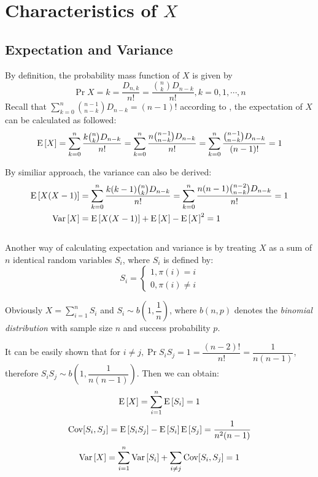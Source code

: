 
\section{Characteristics of $ X$}
\subsection{Expectation and Variance}
\label{f-random}
By definition, the probability mass function of $ X$ is given by
  \begin{equation}
  \Pr{X=k} = \dfrac{D_{n,k}}{n!}=\dfrac{{n\choose{k}}D_{n-k}}{n!}, k = 0,1,\cdots ,n
  \label{eqn:f-pr}
  \end{equation}
Recall that $ \sum_{k=0}^n{n-1 \choose{n-k}}D_{n-k}=(n-1)!$ according to ,
the expectation of $ X$ can be calculated as followed:
\begin{equation}
 \E{X} = \sum_{k=0}^n\dfrac{k{n\choose{k}}D_{n-k}}{n!} = \sum_{k=0}^n\dfrac{n{n-1\choose{n-k}}D_{n-k}}{n!} =
  \sum_{k=0}^n\dfrac{{n-1\choose{n-k}}D_{n-k}}{(n-1)!} = 1
  \label{eqn:exp1}
  \end{equation}

By similiar approach, the variance can also be derived:
\begin{align}
 \E{X(X-1)} &= \sum_{k=0}^n\dfrac{k(k-1){n\choose k}D_{n-k}}{n!}=\sum_{k=0}^n\dfrac{n(n-1){n-2 \choose{n-k}}D_{n-k}}{n!} = 1 \label{eqn:exp2} \\
 \Var{X} &= \E{X(X-1)} + \E{X}-\E{X}^2 = 1 \nonumber
\end{align}
\\

Another way of calculating expectation and variance is by treating $ X$ as a sum of $ n $ identical
random variables $ S_i$, where $ S_i$ is defined by:
\[ S_i = \begin{cases}1, \pi(i)=i\\0,\pi(i)\neq i\end{cases}\]

Obviously $ X = \sum_{i=1}^nS_i$ and $ S_i\sim b(1,\dfrac{1}{n})$, where $ b(n,p)$ denotes the
\emph{binomial distribution} with sample size $ n$ and success probability $ p$.

It can be easily shown that for $ i\neq j, \Pr{S_iS_j=1}=\dfrac{(n-2)!}{n!}=\dfrac{1}{n(n-1)} $, therefore $S_iS_j \sim b(1, \dfrac{1}{n(n-1)})$.
Then we can obtain:
\[ \E{X} = \sum_{i=1}^n\E{S_i} = 1\]
\[ \operatorname{Cov}[S_i,S_j]=\text{E}\left[S_iS_j\right]-\text{E}\left[S_i\right]\text{E}\left[S_j\right]=\dfrac{1}{n^2(n-1)}\]
\[ \Var{X} = \sum_{i=1}^n\Var{S_i}+\sum_{i\neq j}\Cov[S_i,S_j] = 1\]

